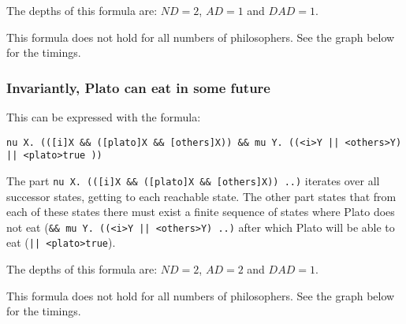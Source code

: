 \documentclass[10pt,a4paper]{article}
\begin{document}
The depths of this formula are: $ND = 2$, $AD = 1$ and $DAD = 1$.

This formula does not hold for all numbers of philosophers. See the graph below for the timings.


\subsubsection{Invariantly, Plato can eat in some future}
This can be expressed with the formula:

\begin{center}
	{\tt nu X. (([i]X \&\& ([plato]X \&\& [others]X)) \&\& mu Y. ((<i>Y || <others>Y) || <plato>true ))}
\end{center}

The part {\tt nu X. (([i]X \&\& ([plato]X \&\& [others]X)) ..)} iterates over all successor states, getting to each reachable state. The other part states that from each of these states there must exist a finite sequence of states where Plato does not eat ({\tt \&\& mu Y. ((<i>Y || <others>Y) ..)} after which Plato will be able to eat ({\tt || <plato>true}).

The depths of this formula are: $ND = 2$, $AD = 2$ and $DAD = 1$.

This formula does not hold for all numbers of philosophers. See the graph below for the timings.

\end{document}
